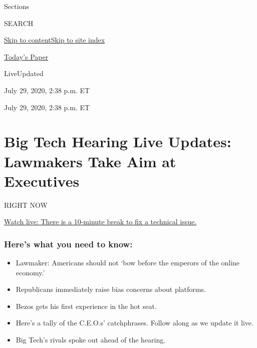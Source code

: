 Sections

SEARCH

\protect\hyperlink{site-content}{Skip to
content}\protect\hyperlink{site-index}{Skip to site index}

\href{https://myaccount.nytimes.com/auth/login?response_type=cookie\&client_id=vi}{}

\href{https://www.nytimes.com/section/todayspaper}{Today's Paper}

LiveUpdated~

July 29, 2020, 2:38 p.m. ET

July 29, 2020, 2:38 p.m. ET

\hypertarget{big-tech-hearing-live-updates-lawmakers-take-aim-at-executives}{%
\section{Big Tech Hearing Live Updates: Lawmakers Take Aim at
Executives}\label{big-tech-hearing-live-updates-lawmakers-take-aim-at-executives}}

RIGHT NOW

\protect\hyperlink{watch-live-there-is-a-10-minute-break-to-fix-a-technical-issue}{Watch
live: There is a 10-minute break to fix a technical issue.}

\hypertarget{heres-what-you-need-to-know}{%
\subsubsection{Here's what you need to
know:}\label{heres-what-you-need-to-know}}

\begin{itemize}
\item
  \protect\hyperlink{lawmaker-americans-should-not-bow-before-the-emperors-of-the-online-economy}{}

  Lawmaker: Americans should not `bow before the emperors of the online
  economy.'
\item
  \protect\hyperlink{republicans-immediately-raise-bias-concerns-about-platforms}{}

  Republicans immediately raise bias concerns about platforms.
\item
  \protect\hyperlink{bezos-gets-his-first-experience-in-the-hot-seat}{}

  Bezos gets his first experience in the hot seat.
\item
  \protect\hyperlink{what-ceos-said}{}

  Here's a tally of the C.E.O.s' catchphrases. Follow along as we update
  it live.
\item
  \protect\hyperlink{big-techs-rivals-spoke-out-ahead-of-the-hearing}{}

  Big Tech's rivals spoke out ahead of the hearing.
\end{itemize}

